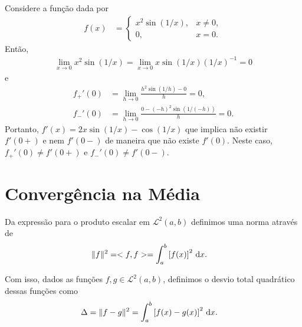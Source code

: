 \begin{exem}
    Considere a fun\c{c}\~{a}o dada por
    \begin{align*}
        f(x) &= \begin{cases}
            x^2 \sin\left( 1 / x \right), & x \neq 0, \\
            0, & x = 0.
        \end{cases}
    \end{align*}
    Ent\~{a}o,
    \begin{align*}
        \lim_{x \to 0} x^2 \sin\left( 1 / x \right) = \lim_{x \to 0} x \sin\left( 1 / x \right) \left( 1 / x \right)^{-1} = 0
    \end{align*}
    e
    \begin{align*}
        f_+'(0) &= \lim_{h \to 0} \frac{h^2 \sin\left( 1 / h \right) - 0}{h} = 0, \\
        f_-'(0) &= \lim_{h \to 0} \frac{0 - (-h)^2 \sin\left( 1 / (-h) \right)}{h} = 0.
    \end{align*}
    Portanto, $f'(x) = 2 x \sin\left( 1 / x \right) - \cos\left( 1 / x \right)$ que implica n\~{a}o existir $f'(0+)$ e nem $f'(0-)$ de maneira que n\~{a}o existe $f'(0)$. Neste caso, $f_+'(0) \neq f'(0+)$ e $f_-'(0) \neq f'(0-)$.
\end{exem}


\section{Converg\^{e}ncia na M\'{e}dia}
Da express\~{a}o para o produto escalar em $\mathcal{L}^2(a, b)$ definimos uma norma atrav\'{e}s de
\begin{align*}
    \| f \|^2 &= <f, f> = \int_a^b \left[ f(x) \right]^2 \, \mathrm{d}x.
\end{align*}

Com isso, dados as fun\c{c}\~{o}es $f, g \in \mathcal{L}^2(a, b)$, definimos o desvio total quadr\'{a}tico dessas fun\c{c}\~{o}es como
\begin{align*}
    \Delta &= \| f - g \|^2 = \int_a^b \left[ f(x) - g(x) \right]^2 \, \mathrm{d}x.
\end{align*}

